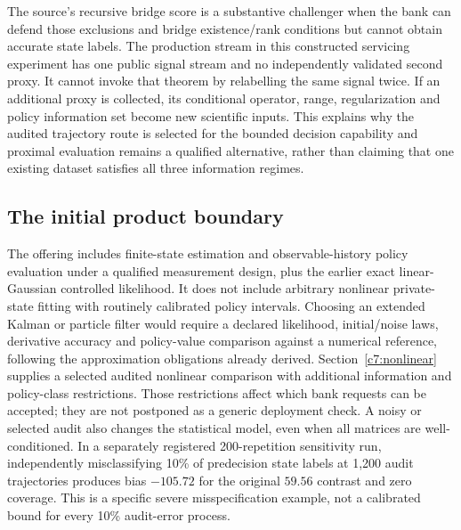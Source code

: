 The source's recursive bridge score is a substantive challenger when the
bank can defend those exclusions and bridge existence/rank conditions but
cannot obtain accurate state labels. The production stream in this constructed servicing experiment has one
public signal stream and no independently validated second proxy. It cannot
invoke that theorem by relabelling the same signal twice. If an additional
proxy is collected, its conditional operator, range, regularization and
policy information set become new scientific inputs. This explains why the
audited trajectory route is selected for the bounded decision capability
and proximal evaluation remains a qualified alternative, rather than
claiming that one existing dataset satisfies all three information regimes.

\subsection{The initial product boundary}
The offering includes finite-state estimation and observable-history policy
evaluation under a qualified measurement design, plus the earlier exact
linear-Gaussian controlled likelihood. It does not include arbitrary nonlinear
private-state fitting with routinely calibrated policy intervals. Choosing
an extended Kalman or particle filter would require a declared likelihood,
initial/noise laws, derivative accuracy and policy-value comparison against
a numerical reference, following the approximation obligations already
derived. Section~\ref{c7:nonlinear} supplies a selected audited nonlinear
comparison with additional information and policy-class restrictions.
Those restrictions affect which bank requests can be accepted; they are
not postponed as a generic deployment check. A noisy or selected audit
also changes the statistical model, even when all matrices are well-conditioned.
In a separately registered 200-repetition sensitivity run, independently
misclassifying 10\% of predecision state labels at 1,200 audit trajectories
produces bias $-105.72$ for the original $59.56$ contrast and zero coverage.
This is a specific severe misspecification example, not a calibrated bound
for every 10\% audit-error process.
